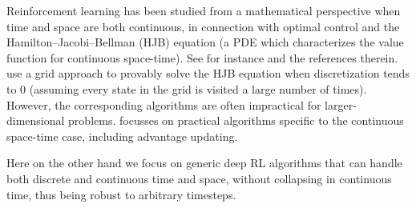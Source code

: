 
Reinforcement learning has been studied from a mathematical perspective
when time and space are both continuous, in connection with optimal
control and the Hamilton--Jacobi--Bellman (HJB) equation (a PDE which
characterizes the value function for continuous space-time). See for
instance
\cite{cont_rl,MunosBourgines98} and the references therein.
\cite{MunosBourgines98} use a grid approach to provably solve the HJB
equation when discretization tends to $0$ (assuming every state in the
grid is visited a large number of times). However,
the corresponding algorithms are
often impractical \cite{cont_rl} for larger-dimensional problems.
\cite{cont_rl} focusses on practical algorithms specific to the continuous
space-time case, including advantage updating.

Here on the other hand we focus on generic deep RL algorithms that can handle
both discrete and continuous time and space, without collapsing in
continuous time, thus being robust to arbitrary timesteps.


